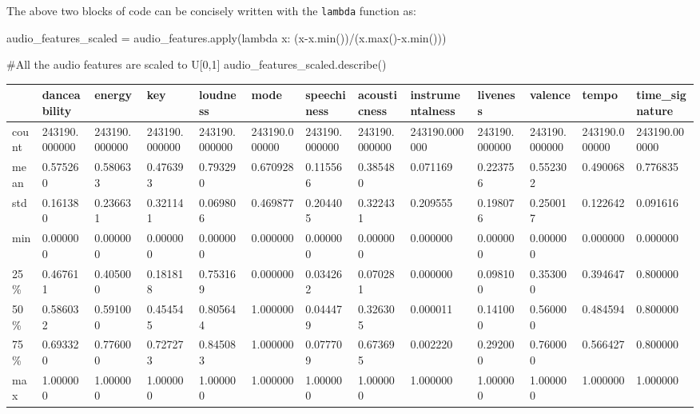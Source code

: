 \documentclass[
  letterpaper,
  DIV=11,
  numbers=noendperiod]{scrreprt}
\newenvironment{Shaded}{\begin{snugshade}}{\end{snugshade}}
\newcommand{\BuiltInTok}[1]{\textcolor[rgb]{0.00,0.23,0.31}{#1}}
\newcommand{\CommentTok}[1]{\textcolor[rgb]{0.37,0.37,0.37}{#1}}
\newcommand{\KeywordTok}[1]{\textcolor[rgb]{0.00,0.23,0.31}{#1}}
\newcommand{\NormalTok}[1]{\textcolor[rgb]{0.00,0.23,0.31}{#1}}
\newcommand{\OperatorTok}[1]{\textcolor[rgb]{0.37,0.37,0.37}{#1}}
\begin{document}
The above two blocks of code can be concisely written with the
\texttt{lambda} function as:

\begin{Shaded}
\begin{Highlighting}[]
\NormalTok{audio\_features\_scaled }\OperatorTok{=}\NormalTok{ audio\_features.}\BuiltInTok{apply}\NormalTok{(}\KeywordTok{lambda}\NormalTok{ x: (x}\OperatorTok{{-}}\NormalTok{x.}\BuiltInTok{min}\NormalTok{())}\OperatorTok{/}\NormalTok{(x.}\BuiltInTok{max}\NormalTok{()}\OperatorTok{{-}}\NormalTok{x.}\BuiltInTok{min}\NormalTok{()))}
\end{Highlighting}
\end{Shaded}

\begin{Shaded}
\begin{Highlighting}[]
\CommentTok{\#All the audio features are scaled to U[0,1]}
\NormalTok{audio\_features\_scaled.describe()}
\end{Highlighting}
\end{Shaded}

\begin{longtable}[]{@{}lllllllllllll@{}}
\toprule\noalign{}
& danceability & energy & key & loudness & mode & speechiness &
acousticness & instrumentalness & liveness & valence & tempo &
time\_signature \\
\midrule\noalign{}
\endhead
\bottomrule\noalign{}
\endlastfoot
count & 243190.000000 & 243190.000000 & 243190.000000 & 243190.000000 &
243190.000000 & 243190.000000 & 243190.000000 & 243190.000000 &
243190.000000 & 243190.000000 & 243190.000000 & 243190.000000 \\
mean & 0.575260 & 0.580633 & 0.476393 & 0.793290 & 0.670928 & 0.115566 &
0.385480 & 0.071169 & 0.223756 & 0.552302 & 0.490068 & 0.776835 \\
std & 0.161380 & 0.236631 & 0.321141 & 0.069806 & 0.469877 & 0.204405 &
0.322431 & 0.209555 & 0.198076 & 0.250017 & 0.122642 & 0.091616 \\
min & 0.000000 & 0.000000 & 0.000000 & 0.000000 & 0.000000 & 0.000000 &
0.000000 & 0.000000 & 0.000000 & 0.000000 & 0.000000 & 0.000000 \\
25\% & 0.467611 & 0.405000 & 0.181818 & 0.753169 & 0.000000 & 0.034262 &
0.070281 & 0.000000 & 0.098100 & 0.353000 & 0.394647 & 0.800000 \\
50\% & 0.586032 & 0.591000 & 0.454545 & 0.805644 & 1.000000 & 0.044479 &
0.326305 & 0.000011 & 0.141000 & 0.560000 & 0.484594 & 0.800000 \\
75\% & 0.693320 & 0.776000 & 0.727273 & 0.845083 & 1.000000 & 0.077709 &
0.673695 & 0.002220 & 0.292000 & 0.760000 & 0.566427 & 0.800000 \\
max & 1.000000 & 1.000000 & 1.000000 & 1.000000 & 1.000000 & 1.000000 &
1.000000 & 1.000000 & 1.000000 & 1.000000 & 1.000000 & 1.000000 \\
\end{longtable}
\end{document}
